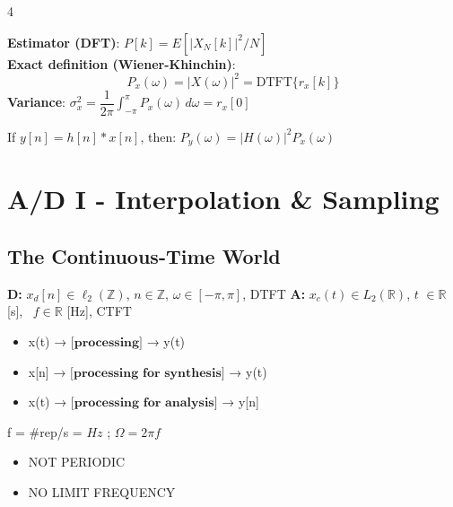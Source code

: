 \documentclass[8pt,a4paper,landscape]{extarticle}
\begin{document}
\begin{multicols*}{4}
\begin{prop}[title=Power Spectral Density (PSD)]
\textbf{Estimator (DFT)}: $P[k] = E\left[|X_N[k]|^2/N\right]$\\
\textbf{Exact definition (Wiener-Khinchin)}:
\[ P_x(\omega) = |X(\omega)|^2 = \mathrm{DTFT}\{r_x[k]\} \]
\textbf{Variance}: $\sigma_x^2 = \dfrac{1}{2\pi}\displaystyle\int_{-\pi}^{\pi} P_x(\omega)\,d\omega = r_x[0]$
\end{prop}

\begin{thm}[title=Convolution theorem (stochastic)]
If $y[n] = h[n] * x[n]$, then: $P_y(\omega) = |H(\omega)|^2 P_x(\omega)$
\end{thm}

\newpage \section{A/D I - Interpolation \& Sampling}

\subsection{The Continuous-Time World}

\begin{defn}[title=CT vs.\ DT paradigm]
\textbf{D:} $x_d[n]\in\ell_2(\mathbb{Z})$, $n\in\mathbb{Z}$, $\omega\in[-\pi,\pi]$, DTFT \newline
\textbf{A:} $x_c(t)\in L_2(\mathbb{R})$, $t$ $\in\mathbb{R}$ [s], \ $f\in\mathbb{R}$ [Hz], CTFT
\end{defn}

\begin{prop}[title=Use cases]
\begin{itemize}
  \item x(t) → $\textbf{[processing]}$ → y(t)
  \item x[n] → $\textbf{[processing for synthesis]}$ → y(t)
  \item x(t) → $\textbf{[processing for analysis]}$ → y[n]
\end{itemize}
\end{prop}

\begin{prop}[title=Real-world frequency]
f = $\#$rep/s = $Hz$ ; $\Omega = 2\pi f$
\end{prop}

\begin{thm}[title=CTFT (more info in cs)]
\begin{itemize}
  \item NOT PERIODIC
  \item NO LIMIT FREQUENCY
\end{itemize}
\end{thm}


\end{multicols*}
\end{document}
